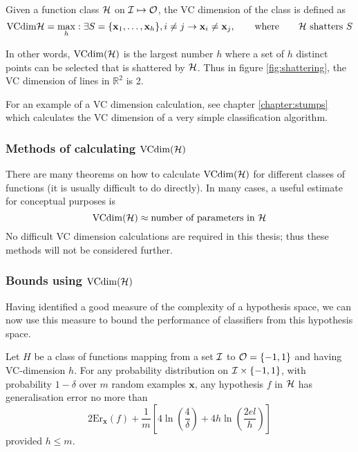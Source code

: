 \begin{definition}[VC dimension]
Given a function class $\mathcal{H}$ on $\mathcal{I} \mapsto \mathcal{O}$, the VC
dimension of the class is defined as
%
\begin{equation}
\mathrm{VCdim}{\mathcal{H}} = \max_{h} : \exists S = \{\mathbf{x}_1, \ldots, \mathbf{x}_h\},
i \neq j \rightarrow \mathbf{x}_i \neq \mathbf{x}_j,
\qquad \mbox{where} \qquad \mbox{\ensuremath{\mathcal{H}}\ shatters $S$}
\end{equation}
\end{definition}

In other words, $\mathrm{VCdim}(\mathcal{H})$ is the largest number $h$ where
a set of $h$ distinct points can be selected that is shattered by
$\mathcal{H}$.  Thus in figure \ref{fig:shattering}, the VC dimension of
lines in $\mathbb{R}^2$ is 2.

For an example of a VC dimension calculation, see
chapter \ref{chapter:stumps} which calculates the VC dimension of a
very simple classification algorithm.


\subsubsection{Methods of calculating $\mathrm{VCdim}(\mathcal{H})$}

There are many theorems on how to calculate $\mathrm{VCdim}(\mathcal{H})$ for
different classes of functions (it is usually difficult to do
directly).  In many cases, a useful estimate for conceptual purposes
is
%
\begin{equation}
\mathrm{VCdim}(\mathcal{H}) \approx \mbox{number of parameters in $\mathcal{H}$}
\end{equation}
%
No difficult VC dimension calculations are required in this thesis;
thus these methods will not be considered further.


\subsubsection{Bounds using $\mathrm{VCdim}(\mathcal{H})$}

Having identified a good measure of the complexity of a hypothesis
space, we can now use this measure to bound the performance of
classifiers from this hypothesis space.

\begin{theorem}
Let $H$ be a class of functions mapping from a set $\mathcal{I}$ to $\mathcal{O} =
\{-1, 1\}$ and having VC-dimension $h$.  For any probability
distribution on $\mathcal{I} \times \{-1,1\}$, with probability $1-\delta$
over $m$ random examples $\mathbf{x}$, any hypothesis $f$ in $\mathcal{H}$
has generalisation error no more than
\begin{equation}
2\mathrm{Er}_{\mathbf{x}}(f) + \frac{1}{m} \left[ 4 \ln 
\left( \frac{4}{\delta} \right) + 4 h \ln \left( \frac{2 e l}{h}
\right) \right]
\end{equation}
provided $h \leq m$.
\end{theorem}

